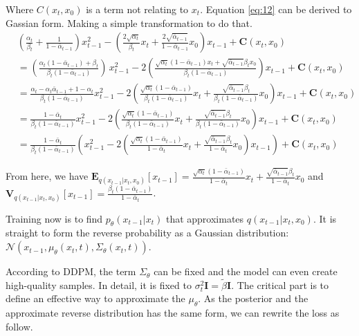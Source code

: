 \documentclass[11pt, oneside]{article}   	%
\begin{document}
Where $C(x_{t}, x_{0})$ is a term not relating to $x_{t}$. Equation \ref{eq:12} can be derived to Gassian form. Making a simple transformation to do that.
\begin{align}
	&(\frac{\alpha_{t}}{\beta_{t}} + \frac{1}{1-\bar{\alpha}_{t-1}})x^{2}_{t-1} - (\frac{2\sqrt{\alpha_{t}}}{\beta_{t}}x_{t} + \frac{2\sqrt{\bar{\alpha}_{t-1}}}{1-\bar{\alpha}_{t-1}}x_{0})x_{t-1} + \mathbf{C}(x_{t}, x_{0}) \\
	&= (\frac{\alpha_{t}(1-\bar{\alpha}_{t-1}) + \beta_{t}}{\beta_{t}(1-\bar{\alpha}_{t-1})})\,x_{t-1}^2 - 2(\frac{\sqrt{\alpha_{t}}(1-\bar{\alpha}_{t-1})x_{t} + \sqrt{\bar{\alpha}_{t-1}}\beta_{t}x_{0}}{\beta_{t}(1-\bar{\alpha}_{t-1})})x_{t-1} + \mathbf{C}(x_{t}, x_{0}) \\
	&=\frac{\alpha_{t}-\alpha_{t}\bar{\alpha}_{t-1} + 1 - \alpha_{t}}{\beta_{t}(1-\bar{\alpha}_{t-1})}x_{t-1}^2 - 2(\frac{\sqrt{\alpha_{t}}(1-\bar{\alpha}_{t-1})}{\beta_{t}(1-\bar{\alpha}_{t-1})}x_{t} + \frac{\sqrt{\bar{\alpha}_{t-1}}\beta_{t}}{\beta_{t}(1-\bar{\alpha}_{t-1})}x_{0})x_{t-1} + \mathbf{C}(x_{t}, x_{0}) \\
	&=\frac{1 - \bar{\alpha}_{t}}{\beta_{t}(1-\bar{\alpha}_{t-1})}x_{t-1}^2 - 2(\frac{\sqrt{\alpha_{t}}(1-\bar{\alpha}_{t-1})}{\beta_{t}(1-\bar{\alpha}_{t-1})}x_{t} + \frac{\sqrt{\bar{\alpha}_{t-1}}\beta_{t}}{\beta_{t}(1-\bar{\alpha}_{t-1})}x_{0})x_{t-1} + \mathbf{C}(x_{t}, x_{0}) \\
	&=\frac{1 - \bar{\alpha}_{t}}{\beta_{t}(1-\bar{\alpha}_{t-1})}\left( x_{t-1}^2 - 2(\frac{\sqrt{\alpha_{t}}(1-\bar{\alpha}_{t-1})}{1 - \bar{\alpha}_{t}}x_{t} + \frac{\sqrt{\bar{\alpha}_{t-1}}\beta_{t}}{1 - \bar{\alpha}_{t}}x_{0})x_{t-1}\right) + \mathbf{C}(x_{t}, x_{0})
\end{align}

From here, we have $\mathbf{E}_{q(x_{t-1}|x_{t},x_{0})}[x_{t-1}] = \frac{\sqrt{\alpha_{t}}(1-\bar{\alpha}_{t-1})}{1 - \bar{\alpha}_{t}}x_{t} + \frac{\sqrt{\bar{\alpha}_{t-1}}\beta_{t}}{1 - \bar{\alpha}_{t}}x_{0}$ and ${\mathbf{V}_{q(x_{t-1}|x_{t},x_{0})}[x_{t-1}] = \frac{\beta_{t}(1-\bar{\alpha}_{t-1})}{1 - \bar{\alpha}_{t}}}$.
 
\vspace{1cm}

Training now is to find $p_{\theta}(x_{t-1}|x_{t})$ that approximates $q(x_{t-1}|x_{t}, x_{0})$.
It is straight to form the reverse probability as a Gaussian distribution: $\mathcal{N}(x_{t-1}, \mu_{\theta}(x_{t}, t), \Sigma_{\theta}(x_{t}, t))$.

According to DDPM, the term $\Sigma_{\theta}$ can be fixed and the model can even create high-quality samples. In detail, it is fixed to $\sigma_{t}^{2}\mathbf{I} = \tilde{\beta}\mathbf{I}$. The critical part is to define an effective way to approximate the $\mu_{\theta}$. As the posterior and the approximate reverse distribution has the same form, we can rewrite the loss as follow.
\end{document}
